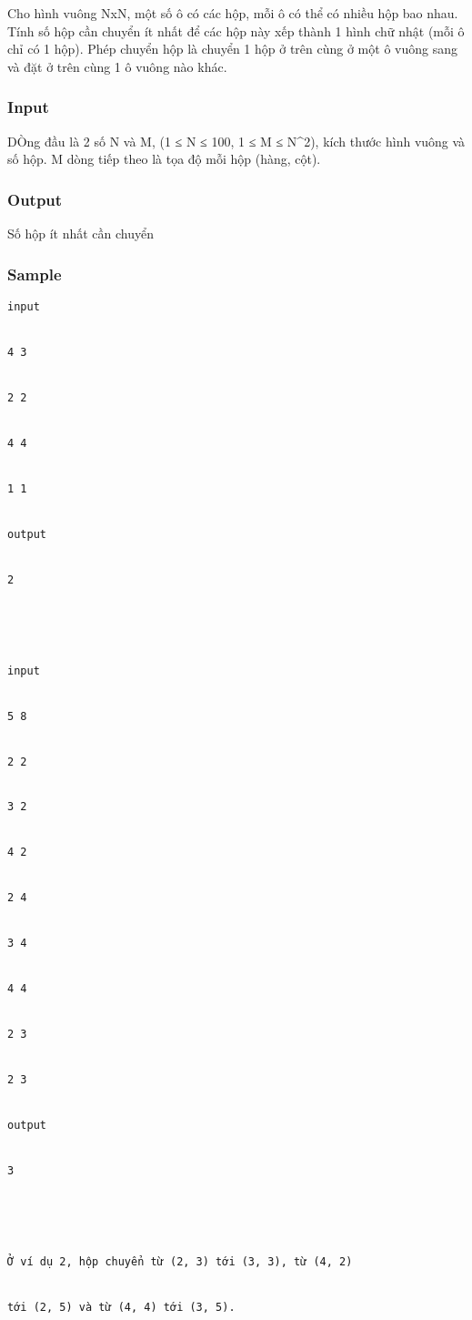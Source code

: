 









   Cho hình vuông NxN, một số ô có các hộp, mỗi ô có thể có nhiều hộp bao nhau. Tính số hộp cần chuyển ít nhất để các hộp này xếp thành 1 hình chữ nhật (mỗi ô chỉ có 1 hộp). Phép chuyển hộp là chuyển 1 hộp ở trên cùng ở một ô vuông sang và đặt ở trên cùng 1 ô vuông nào khác.  



\subsubsection{   Input  }



   DÒng đầu là 2 số N và M,  (1 ≤ N ≤ 100, 1 ≤ M ≤ N^2), kích thước hình vuông và số hộp. M dòng tiếp theo là tọa độ mỗi hộp (hàng, cột).  



\subsubsection{   Output  }



   Số hộp ít nhất cần chuyển  



\subsubsection{   Sample  }
\begin{verbatim}
input


4 3


2 2


4 4


1 1


output


2





input


5 8


2 2


3 2


4 2


2 4


3 4


4 4


2 3


2 3


output


3





Ở ví dụ 2, hộp chuyển từ (2, 3) tới (3, 3), từ (4, 2)


tới (2, 5) và từ (4, 4) tới (3, 5).


\end{verbatim}

